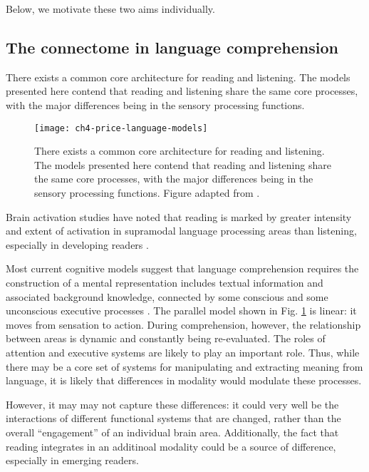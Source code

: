 Below, we motivate these two aims individually.

\subsection{The connectome in language comprehension}

There exists a common core architecture for reading and listening. The models presented here contend that reading and listening share the same core processes, with the major differences being in the sensory processing functions.

\begin{figure}[t]
	\centering
	\texttt{[image: ch4-price-language-models]}
    \caption[Common core architecture for reading and listening.]{There exists a common core architecture for reading and listening. The models presented here contend that reading and listening share the same core processes, with the major differences being in the sensory processing functions. Figure adapted from \citep{Price2012}.}
	\label{fig:ch4-price-language-models}
\end{figure}

Brain activation studies have noted that reading is marked by greater intensity and extent of activation in supramodal language processing areas than listening, especially in developing readers \citep{Berl2010}. 

Most current cognitive models suggest that language comprehension requires the construction of a mental representation includes textual information and associated background knowledge, connected by some conscious and some unconscious executive processes \citep{Kendeou2014}. The parallel model shown in Fig. \ref{fig:ch4-price-language-models} is linear: it moves from sensation to action. During comprehension, however, the relationship between areas is dynamic and constantly being re-evaluated. The roles of attention and executive systems are likely to play an important role. Thus, while there may be a core set of systems for manipulating and extracting meaning from language, it is likely that differences in modality would modulate these processes. 

However, it may may not capture these differences: it could very well be the interactions of different functional systems that are changed, rather than the overall ``engagement'' of an individual brain area. Additionally, the fact that reading integrates in an additinoal modality could be a source of difference, especially in emerging readers. 

